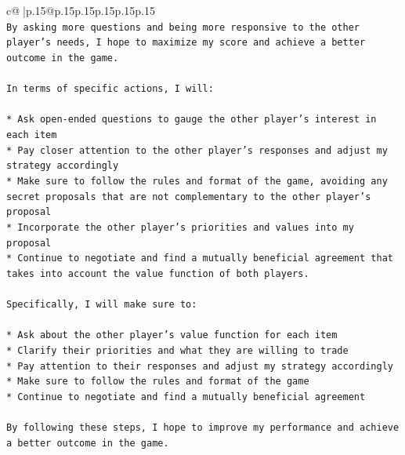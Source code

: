 \documentclass{article}
\begin{document}
{\begin{supertabular}{c@{$\;$}|p{.15\linewidth}@{}p{.15\linewidth}p{.15\linewidth}p{.15\linewidth}p{.15\linewidth}p{.15\linewidth}}
{{{\\ 
\texttt{By asking more questions and being more responsive to the other player's needs, I hope to maximize my score and achieve a better outcome in the game.} \\
\\ 
\texttt{In terms of specific actions, I will:} \\
\\ 
\texttt{* Ask open{-}ended questions to gauge the other player's interest in each item} \\
\texttt{* Pay closer attention to the other player's responses and adjust my strategy accordingly} \\
\texttt{* Make sure to follow the rules and format of the game, avoiding any secret proposals that are not complementary to the other player's proposal} \\
\texttt{* Incorporate the other player's priorities and values into my proposal} \\
\texttt{* Continue to negotiate and find a mutually beneficial agreement that takes into account the value function of both players.} \\
\\ 
\texttt{Specifically, I will make sure to:} \\
\\ 
\texttt{* Ask about the other player's value function for each item} \\
\texttt{* Clarify their priorities and what they are willing to trade} \\
\texttt{* Pay attention to their responses and adjust my strategy accordingly} \\
\texttt{* Make sure to follow the rules and format of the game} \\
\texttt{* Continue to negotiate and find a mutually beneficial agreement} \\
\\ 
\texttt{By following these steps, I hope to improve my performance and achieve a better outcome in the game.} \\
            }
        }
    }
     \\ \\

\end{supertabular}
}
\end{document}

